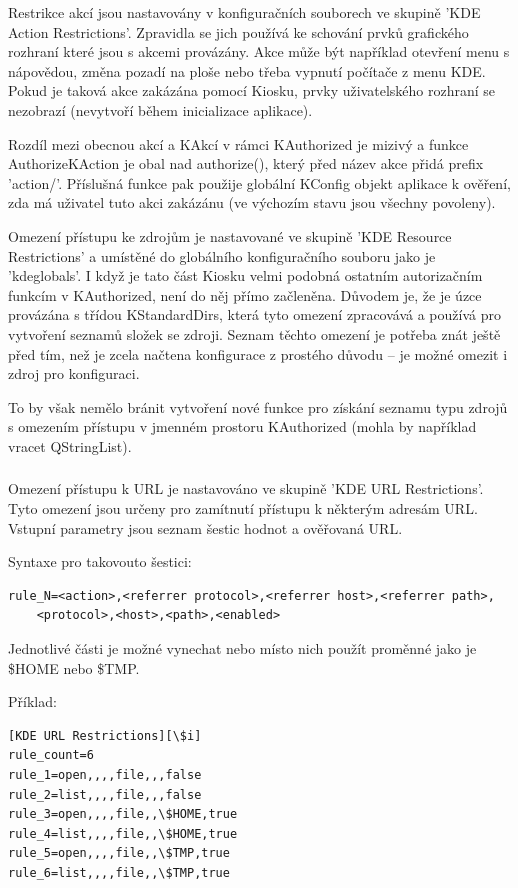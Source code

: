 Restrikce akcí jsou nastavovány v konfiguračních souborech ve skupině
'KDE Action Restrictions'. Zpravidla se jich používá ke schování prvků
grafického rozhraní které jsou s akcemi provázány. Akce může být
například otevření menu s nápovědou, změna pozadí na ploše nebo třeba vypnutí
počítače z menu KDE. Pokud je taková akce zakázána pomocí Kiosku, prvky
uživatelského rozhraní se nezobrazí (nevytvoří během inicializace aplikace).

Rozdíl mezi obecnou akcí a KAkcí v rámci KAuthorized je mizivý a funkce
AuthorizeKAction je obal nad authorize(), který před název akce přidá prefix
'action/'. Příslušná funkce pak použije globální KConfig objekt aplikace
k ověření, zda má uživatel tuto akci zakázánu (ve výchozím stavu jsou všechny
povoleny).

Omezení přístupu ke zdrojům je nastavované ve skupině
'KDE Resource Restrictions' a umístěné do globálního konfiguračního souboru jako
je 'kdeglobals'. I když je tato část Kiosku velmi podobná ostatním autorizačním
funkcím v KAuthorized, není do něj přímo začleněna. Důvodem je, že je úzce
provázána s třídou KStandardDirs, která tyto omezení zpracovává a používá pro
vytvoření seznamů složek se zdroji. Seznam těchto omezení je potřeba znát ještě
před tím, než je zcela načtena konfigurace z prostého důvodu -- je možné omezit
i zdroj pro konfiguraci.

To by však nemělo bránit vytvoření nové funkce pro získání seznamu typu zdrojů
s omezením přístupu v jmenném prostoru KAuthorized (mohla by například vracet
QStringList).

\subsubsection{}
Omezení přístupu k URL je nastavováno ve skupině 'KDE URL Restrictions'. Tyto
omezení jsou určeny pro zamítnutí přístupu k některým adresám URL. Vstupní
parametry jsou seznam šestic hodnot a ověřovaná URL.

Syntaxe pro takovouto šestici:
\begin{verbatim}
rule_N=<action>,<referrer protocol>,<referrer host>,<referrer path>,
    <protocol>,<host>,<path>,<enabled>
\end{verbatim}

Jednotlivé části je možné vynechat nebo místo nich použít proměnné jako
je \$HOME nebo \$TMP.

Příklad:
\begin{verbatim}
[KDE URL Restrictions][\$i]
rule_count=6
rule_1=open,,,,file,,,false
rule_2=list,,,,file,,,false
rule_3=open,,,,file,,\$HOME,true
rule_4=list,,,,file,,\$HOME,true
rule_5=open,,,,file,,\$TMP,true
rule_6=list,,,,file,,\$TMP,true
\end{verbatim}

